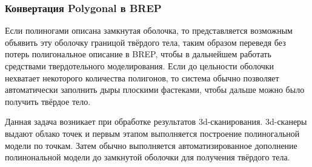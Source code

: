 


\subsubsection{Конвертация Polygonal в BREP}\label{sec:secPolyToBREP}

Если полиногами описана замкнутая оболочка, то представляется возможным объявить эту оболочку границой твёрдого тела, таким образом переведя без потерь полигональное описание в BREP, чтобы в дальнейшем работать средствами твердотельного моделирования. Если до цельности оболочки нехватает некоторого количества полигонов, то система обычно позволяет автоматически заполнить дыры плоскими фастеками, чтобы дальше можно было получить твёрдое тело.

Данная задача возникает при обработке результатов 3d-сканирования. 3d-сканеры выдают облако точек и первым этапом выполняется построение полиногальной модели по точкам. Затем обычно выполняется автоматизированное дополнение полинональной модели до замкнутой оболочки для получения твёрдого тела.



